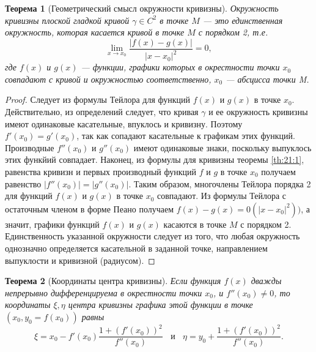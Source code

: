 \documentclass[12pt]{report}
\numberwithin{equation}{section}
\newtheorem{theorem}{Теорема}[section]
\begin{document}
\begin{theorem} [Геометрический смысл окружности кривизны] \label{th:22:1}
Окружность кривизны плоской гладкой кривой $\gamma \in C^2$ в точке $M$ --- это единственная окружность, которая касается кривой в точке $M$ с порядком 2, т.е.
\[ \lim_{x \to x_0} \frac{|f(x) - g(x)|}{|x - x_0|^2} = 0,\] 
где $f(x)$ и $g(x)$ --- функции, графики которых в окрестности точки $x_0$ совпадают с кривой и окружностью соответственно, $x_0$ --- абсцисса точки M.
\end{theorem}
\begin{proof}
Следует из формулы Тейлора для функций $f(x)$ и $g(x)$ в точке $x_0$. Действительно, из определений следует, что кривая $\gamma$ и ее окружность кривизны имеют одинаковые касательные, впуклось и кривизну. Поэтому $f'(x_0) = g'(x_0)$, так как сопадают касательные к графикам этих функций. Производные $f''(x_0)$ и $g''(x_0)$ имеют одинаковые знаки, поскольку выпуклось этих функйий совпадает. Наконец, из формулы для кривизны теоремы \ref{th:21:1}, равенства кривизн и первых производный функций $f$ и $g$ в точке $x_0$ получаем равенство $|f''(x_0)| = |g''(x_0)|$. Таким образом, многочлены Тейлора порядка 2 для функций $f(x)$ и $g(x)$ в точке $x_0$ совпадают. Из формулы Тейлора с остаточным членом в форме Пеано получаем $f(x) - g(x) = 0(|x- x_0|^2))$, а значит, графики функций $f(x)$ и $g(x)$ касаются в точке $M$ с порядком 2.\\

Единственность указанной окружности следует из того, что любая окружность однозначно определяется касательной в заданной точке, направлением выпуклости и кривизной (радиусом).
\end{proof}

\begin{theorem}[Координаты центра кривизны]
Если функция $f(x)$ дважды непрерывно дифференцируема в окрестности точки $x_0$, и $f''(x_0) \neq 0$, то координаты $\xi, \eta$ центра кривизны графика этой функции в точке $(x_0,y_0 = f(x_0))$ равны
\begin{equation} \label{eq:22:1}
\xi = x_0 - f'(x_0) \frac{1 + (f'(x_0))^2}{f''(x_0)}~~~~\text{и}~~~~\eta = y_0 + \frac{1 + (f'(x_0))^2}{f''(x_0)}.
\end{equation}
\end{theorem}
\end{document}
